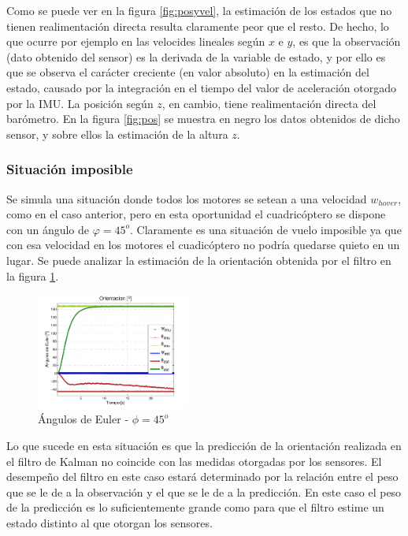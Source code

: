 \documentclass[main]{subfiles}
\begin{document}
Como se puede ver en la figura \ref{fig:posyvel}, la estimación de los estados que no tienen realimentación directa resulta claramente peor que el resto. De hecho, lo que ocurre por ejemplo en las velocides lineales según $x$ e $y$, es que la observación (dato obtenido del sensor) es la derivada de la variable de estado, y por ello es que se observa el carácter creciente (en valor absoluto) en la estimación del estado, causado por la integración en el tiempo del valor de aceleración otorgado por la IMU. La posición según $z$, en cambio, tiene realimentación directa del barómetro. En la figura \ref{fig:pos} se muestra en negro los datos obtenidos de dicho sensor, y sobre ellos la estimación de la altura $z$.

\subsubsection{Situación imposible}

Se simula una situación donde todos los motores se setean a una velocidad $w_{hover}$, como en el caso anterior, pero en esta oportunidad el cuadricóptero se dispone con un ángulo de $\varphi = 45^o$. Claramente es una situación de vuelo imposible ya que con esa velocidad en los motores el cuadicóptero no podría quedarse quieto en un lugar. Se puede analizar la estimación de la orientación obtenida por el filtro en la figura \ref{fig:45}.

\begin{figure}
	\begin{center}	
	\vspace{-10pt}
	\includegraphics[width=0.45\textwidth]
		{./pics_kalman/45.pdf}
	\end{center}
	\caption{Ángulos de Euler - $\phi = 45^o$}
	\label{fig:45}
\end{figure}

Lo que sucede en esta situación es que la predicción de la orientación realizada en el filtro de Kalman no coincide con las medidas otorgadas por los sensores. El desempeño del filtro en este caso estará determinado por la relación entre el peso que se le de a la observación y el que se le de a la predicción. En este caso el peso de la predicción es lo suficientemente grande como para que el filtro estime un estado distinto al que otorgan los sensores.
\end{document}
